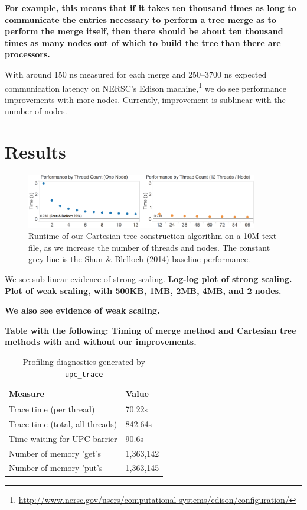 \documentclass[10pt]{article}
\begin{document}
\textbf{For example, this means that if it takes ten thousand times as long to communicate the entries necessary to perform a tree merge as to perform the merge itself, then there should be about ten thousand times as many nodes out of which to build the tree than there are processors.}

With around 150 ns measured for each merge and 250--3700 ns expected communication latency on NERSC's Edison machine,\footnote{\url{http://www.nersc.gov/users/computational-systems/edison/configuration/}} we do see performance improvements with more nodes.
Currently, improvement is sublinear with the number of nodes. 

\section{Results}

\begin{figure}
\centering
\includegraphics[width=0.9\textwidth]{figures/benchmarks}
\caption{%
Runtime of our Cartesian tree construction algorithm on a 10M text file, as we increase the number of threads and nodes.
The constant grey line is the Shun \& Blelloch (2014) baseline performance.
}
\label{fig:benchmarks}
\end{figure}

We see sub-linear evidence of strong scaling.
\textbf{%
Log-log plot of strong scaling.
Plot of weak scaling, with 500KB, 1MB, 2MB, 4MB, and 2 nodes.
}

\textbf{%
We also see evidence of weak scaling.
}

\textbf{%
Table with the following:
Timing of merge method and Cartesian tree methods with and without our improvements.
}

\begin{table}[t]
\caption{Profiling diagnostics generated by \texttt{upc\_trace}}
\vspace{1.5ex}
\label{tab:profiling_diagnostics}
\centering
\begin{tabular}{ll}
\toprule
\textbf{Measure} & \textbf{Value} \\
\midrule
Trace time (per thread) & 70.22s \\ \midrule
Trace time (total, all threads) & 842.64s \\ \midrule
Time waiting for UPC barrier & 90.6s \\ \midrule
Number of memory 'get's & 1,363,142 \\ \midrule
Number of memory 'put's & 1,363,145 \\ \midrule
\end{tabular}
\end{table}
\end{document}
